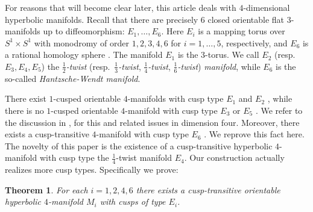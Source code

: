 \documentclass{amsart}
\newtheorem{thm}[lemma]{Theorem}
\theoremstyle{definition}
\theoremstyle{remark}
\begin{document}
For reasons that will become clear later, this article deals with $4$-dimensional hyperbolic manifolds. Recall that there are precisely $6$ closed orientable flat $3$-manifolds up to diffeomorphism: %
$E_1, \ldots, E_6$. Here $E_i$ is a mapping torus over $S^1 \times S^1$ with monodromy of order $1, 2, 3, 4, 6$ for $i = 1, \ldots, 5$, respectively, and $E_6$ is a rational homology sphere \cite[Section 12.3]{MA}. The manifold $E_1$ is the $3$-torus. We call $E_2$ (resp.~$E_3, E_4, E_5$) the \emph{$\frac{1}{2}$-twist} (resp.~\emph{$\frac{1}{3}$-twist}, \emph{$\frac{1}{4}$-twist}, \emph{$\frac{1}{6}$-twist}) \emph{manifold}, while $E_6$ is the so-called \emph{Hantzsche-Wendt manifold}.

There exist $1$-cusped orientable $4$-manifolds with cusp type $E_1$ \cite{KM} and $E_2$ \cite{KS}, while there is no $1$-cusped orientable $4$-manifold with cusp type $E_3$ or $E_5$ \cite{LR}. We refer to the discussion in  \cite[Sections 2.5 and 2.6]{MR3888615}, for this and related issues in dimension four. Moreover, there exists a cusp-transitive $4$-manifold with cusp type $E_6$ \cite{FKS}. We reprove this fact here. 
The novelty of this paper is the existence of a cusp-transitive hyperbolic $4$-manifold with cusp type the $\frac{1}{4}$-twist manifold $E_4$. Our construction actually realizes more cusp types. Specifically we prove:


%

\begin{thm} \label{thm:main}
For each $i = 1, 2, 4, 6$ there exists a cusp-transitive orientable hyperbolic $4$-manifold $M_i$ with cusps of type $E_i$.
\end{thm}


\end{document}
